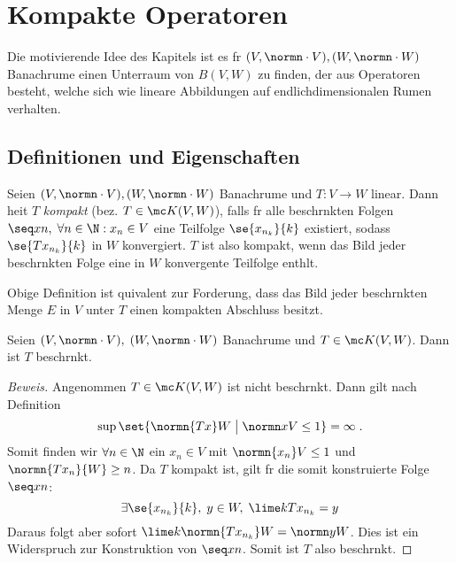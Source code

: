 \chapter{Kompakte Operatoren}
\begin{rem}[Motivation]
	Die motivierende Idee des Kapitels ist es f\us r \((V,\normn\cdot V),(W,\normn\cdot W)\) Banachr\as ume einen Unterraum von \(B(V,W)\) zu finden, der aus Operatoren besteht, welche sich wie lineare Abbildungen auf endlichdimensionalen R\as umen verhalten.
\end{rem}

\section{Definitionen und Eigenschaften}
\begin{definition}
	Seien \((V,\normn\cdot V), (W,\normn\cdot W)\) Banachr\as ume und \(T: V\to W\) linear. Dann hei\s t $T$ \textit{kompakt} (bez. \(T\in \mc K(V,W)\)), falls f\us r alle beschr\as nkten Folgen \(\seq xn,\; \forall n\in \N: x_n \in V\) eine Teilfolge \(\se{x_{n_k}}{k}\) existiert, sodass \(\se{Tx_{n_k}}{k}\) in $W$ konvergiert. $T$ ist also kompakt, wenn das Bild jeder beschr\as nkten Folge eine in $W$ konvergente Teilfolge enth\as lt.
\end{definition}

\begin{rem}
  Obige Definition ist \as quivalent zur Forderung, dass das Bild jeder beschr\as nkten Menge $E$ in $V$ unter $T$ einen kompakten Abschluss besitzt.	
\end{rem}

\begin{theorem}
	Seien \((V,\normn\cdot V),\;(W,\normn\cdot W)\) Banachr\as ume und \(T\in\mc K(V,W)\). Dann ist $T$ beschr\as nkt.
\end{theorem}
\begin{proof}[Beweis]
	Angenommen $T\in \mc K(V,W)$ ist nicht beschr\as nkt. Dann gilt nach Definition 
	\[\sup\set{\normn{Tx}W \;\big\vert\; \normn xV \leq 1} = \infty\;.\]
	Somit finden wir \(\forall n\in\N\) ein \(x_n\in V\) mit \(\normn{x_n}V \leq 1\) und \(\normn{Tx_n}{W}\geq n\). Da $T$ kompakt ist, gilt f\us r die somit konstruierte Folge \(\seq xn\):
	\[\exists \se{x_{n_k}}{k}, \; y\in W,\; \lime k Tx_{n_k} = y\]
	Daraus folgt aber sofort \(\lime k \normn{Tx_{n_k}}W = \normn yW\). Dies ist ein Widerspruch zur Konstruktion von \(\seq xn\). Somit ist $T$ also beschr\as nkt.
	\end{proof}

